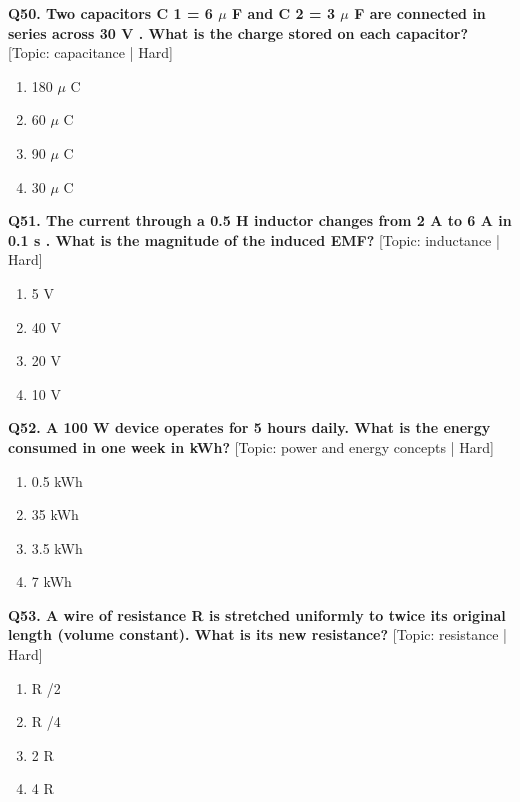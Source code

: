 \noindent\textbf{Q50. Two capacitors C 1 = 6 $\mu$ F and C 2 = 3 $\mu$ F are connected in series across 30 V . What is the charge stored on each capacitor?} \hfill [Topic: capacitance | Hard]
\begin{enumerate}[label=(\alph*),topsep=2pt,itemsep=1pt,partopsep=0pt,parsep=0pt]
    \item {180 $\mu$ C}
    \item {60 $\mu$ C}
    \item {90 $\mu$ C}
    \item {30 $\mu$ C}
\end{enumerate}
\vspace{2mm}

\noindent\textbf{Q51. The current through a 0.5 H inductor changes from 2 A to 6 A in 0.1 s . What is the magnitude of the induced EMF?} \hfill [Topic: inductance | Hard]
\begin{enumerate}[label=(\alph*),topsep=2pt,itemsep=1pt,partopsep=0pt,parsep=0pt]
    \item {5 V}
    \item {40 V}
    \item {20 V}
    \item {10 V}
\end{enumerate}
\vspace{2mm}

\noindent\textbf{Q52. A 100 W device operates for 5 hours daily. What is the energy consumed in one week in kWh?} \hfill [Topic: power and energy concepts | Hard]
\begin{enumerate}[label=(\alph*),topsep=2pt,itemsep=1pt,partopsep=0pt,parsep=0pt]
    \item {0.5 kWh}
    \item {35 kWh}
    \item {3.5 kWh}
    \item {7 kWh}
\end{enumerate}
\vspace{2mm}

\noindent\textbf{Q53. A wire of resistance R is stretched uniformly to twice its original length (volume constant). What is its new resistance?} \hfill [Topic: resistance | Hard]
\begin{enumerate}[label=(\alph*),topsep=2pt,itemsep=1pt,partopsep=0pt,parsep=0pt]
    \item {R /2}
    \item {R /4}
    \item {2 R}
    \item {4 R}
\end{enumerate}
\vspace{2mm}

